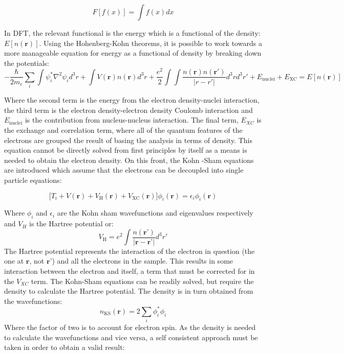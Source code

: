 \begin{equation}
F[f(x)] = \int f(x) dx
\end{equation}

 In DFT, the relevant functional is the energy which is a functional of the density: $E[n(\textbf{r})]$.  Using the Hohenberg-Kohn theorems, it is possible to work towards a more manageable equation for energy as a functional of density by breaking down the potentials: 
\begin{equation}
-\frac{\hbar}{2m_e} \sum_{i} \int \psi_i^* \nabla^2\psi_id^3r + \int V(\textbf{r})n(\textbf{r})d^3r + \frac{e^2}{2} \int \int \frac{n(\textbf{r})n(\textbf{r}')}{|r-r'|}d^3r d^3r' + E_{\mathrm{nuclei}} + E_{\mathrm{XC}} = E[n(\textbf{r})]
\end{equation}

Where the second term is the energy from the electron density-nuclei interaction, the third term is the electron density-electron density Coulomb interaction and $E_{\mathrm{nuclei}}$ is the contribution from nucleus-nucleus interaction.  The final term, $E_{XC}$ is the exchange and correlation term, where all of the quantum features of the electrons are grouped the result of basing the analysis in terms of density. This equation cannot be directly solved from first principles by itself as a means is needed to obtain the electron density.  On this front, the Kohn -Sham equations are introduced which assume that the electrons can be decoupled into single particle equations: 

\begin{equation}
    \bigg[T_i + V(\textbf{r}) + V_{\mathrm{H}}(\textbf{r}) + V_{\mathrm{XC}}(\textbf{r})\bigg] \phi_i(\textbf{r}) = \epsilon_i \phi_i(\textbf{r})
    \label{ks_eq}
\end{equation}

Where $\phi_i$ and $\epsilon_i$ are the Kohn sham wavefunctions and eigenvalues respectively and $V_H$ is the Hartree potential or: 
\begin{equation}
    V_\mathrm{H} = e^2 \int \frac{n(\textbf{r'})}{|\textbf{r}-\textbf{r'}|}d^3r'
\end{equation}
The Hartree potential represents the interaction of the electron in question (the one at $\textbf{r}$, not $\textbf{r'}$) and all the electrons in the sample.  This results in some interaction between the electron and itself, a term that must be corrected for in the $V_{XC}$ term.  The Kohn-Sham equations can  be readily solved, but require the density to calculate the Hartree potential.  The density is in turn obtained from the wavefunctions: 
\begin{equation}
	n_{\mathrm{KS}}(\textbf{r}) = 2 \sum_{i} \phi_i^*\phi_i
	\label{KS_density}
\end{equation}
Where the factor of two is to account for electron spin.  As the density is needed to calculate the wavefunctions and vice versa, a self consistent approach must be taken in order to obtain a valid result:  

